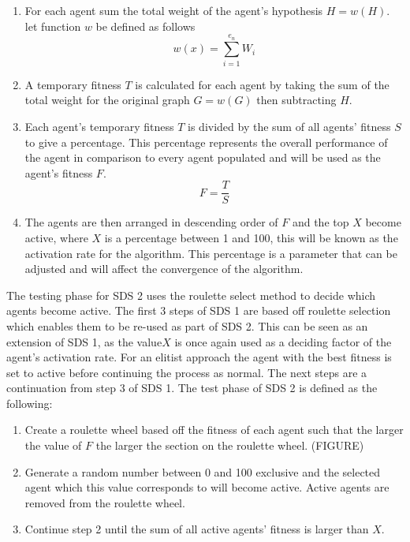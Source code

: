 \documentclass{AISB2008}
\begin{document}
\begin{enumerate}
\item For each agent sum the total weight of the agent’s hypothesis {$H = w (H)$}. let function {$w$} be defined as follows
\begin{equation} \label{weight funtion}
w(x) = \sum\limits_{i=1}^{e_n} {W_i} 
\end{equation}
\item A temporary fitness {$T$} is calculated for each agent by taking the sum of the total weight for the original graph {$G = w (G)$} then subtracting {$H$}.
\item Each agent’s temporary fitness {$T$} is divided by the sum of all agents' fitness {$S$} to give a percentage. This percentage represents the overall performance of the agent in comparison to every agent populated and will be used as the agent’s fitness {$F$}.
\begin{equation}
F = \frac{T}{S}
\end{equation}
\item The agents are then arranged in descending order of {$F$} and the top {$X$} become active, where {$X$} is a percentage between 1 and 100, this will be known as the activation rate for the algorithm. This percentage is a parameter that can be adjusted and will affect the convergence of the algorithm.
\end{enumerate}

The testing phase for SDS 2 uses the roulette select method to decide which agents become active. The first 3 steps of SDS 1 are based off roulette selection which enables them to be re-used as part of SDS 2. This can be seen as an extension of SDS 1, as the value{$X$} is once again used as a deciding factor of the agent’s activation rate. For an elitist approach the agent with the best fitness is set to active before continuing the process as normal.
The next steps are a continuation from step 3 of SDS 1. The test phase of SDS 2 is defined as the following:

\begin{enumerate}
\item Create a roulette wheel based off the fitness of each agent such that the larger the value of {$F$} the larger the section on the roulette wheel. (FIGURE)
\item Generate a random number between 0 and 100 exclusive and the selected agent which this value corresponds to will become active. Active agents are removed from the roulette wheel.
\item Continue step 2 until the sum of all active agents’ fitness is larger than {$X$}.
\end{enumerate}
\end{document}
